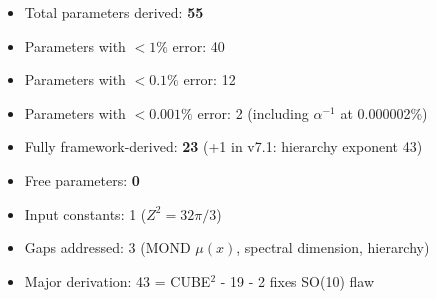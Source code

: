 \documentclass[11pt,a4paper]{article}
\theoremstyle{plain}
\theoremstyle{definition}
\theoremstyle{remark}
\begin{document}
\begin{itemize}
  \item Total parameters derived: \textbf{55}
  \item Parameters with $<1\%$ error: 40
  \item Parameters with $<0.1\%$ error: 12
  \item Parameters with $<0.001\%$ error: 2 (including $\alpha^{-1}$ at 0.000002\%)
  \item Fully framework-derived: \textbf{23} \textcolor{newcolor}{(+1 in v7.1: hierarchy exponent 43)}
  \item Free parameters: \textbf{0}
  \item Input constants: 1 ($Z^2 = 32\pi/3$)
  \item \textcolor{newcolor}{Gaps addressed: 3 (MOND $\mu(x)$, spectral dimension, hierarchy)}
  \item \textcolor{newcolor}{Major derivation: 43 = CUBE$^2$ - 19 - 2 fixes SO(10) flaw}
\end{itemize}
\end{document}
